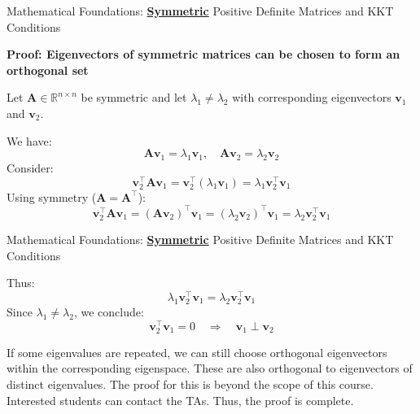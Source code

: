 \documentclass{beamer}
\begin{document}
\begin{frame}{Mathematical Foundations: \textbf{\underline{Symmetric}} Positive Definite Matrices and KKT Conditions}

\textbf{Proof: Eigenvectors of symmetric matrices can be chosen to form an orthogonal set}

Let $\bm{A} \in \mathbb{R}^{n \times n}$ be symmetric and let $\lambda_1 \neq \lambda_2$ with corresponding eigenvectors $\bm{v}_1$ and $\bm{v}_2$.

We have:
\[
\bm{A}\bm{v}_1 = \lambda_1 \bm{v}_1, \quad \bm{A}\bm{v}_2 = \lambda_2 \bm{v}_2
\]
Consider:
\[
\bm{v}_2^{\top} \bm{A} \bm{v}_1 = \bm{v}_2^{\top} (\lambda_1 \bm{v}_1) = \lambda_1 \bm{v}_2^{\top} \bm{v}_1
\]
Using symmetry ($\bm{A} = \bm{A}^{\top}$):
\[
\bm{v}_2^{\top} \bm{A} \bm{v}_1 = (\bm{A} \bm{v}_2)^{\top} \bm{v}_1 = (\lambda_2 \bm{v}_2)^{\top} \bm{v}_1 = \lambda_2 \bm{v}_2^{\top} \bm{v}_1
\]

\end{frame}

\begin{frame}{Mathematical Foundations: \textbf{\underline{Symmetric}} Positive Definite Matrices and KKT Conditions}

Thus:
\[
\lambda_1 \bm{v}_2^{\top} \bm{v}_1 = \lambda_2 \bm{v}_2^{\top} \bm{v}_1
\]
Since $\lambda_1 \neq \lambda_2$, we conclude:
\[
\boxed{\bm{v}_2^{\top} \bm{v}_1 = 0 \quad \Rightarrow \quad \bm{v}_1 \perp \bm{v}_2}
\]

If some eigenvalues are repeated, we can still choose orthogonal eigenvectors within the corresponding eigenspace. These are also orthogonal to eigenvectors of distinct eigenvalues. The proof for this is beyond the scope of this course. Interested students can contact the TAs.
\vspace{0.3cm}
Thus, the proof is complete.

\end{frame}
\end{document}
